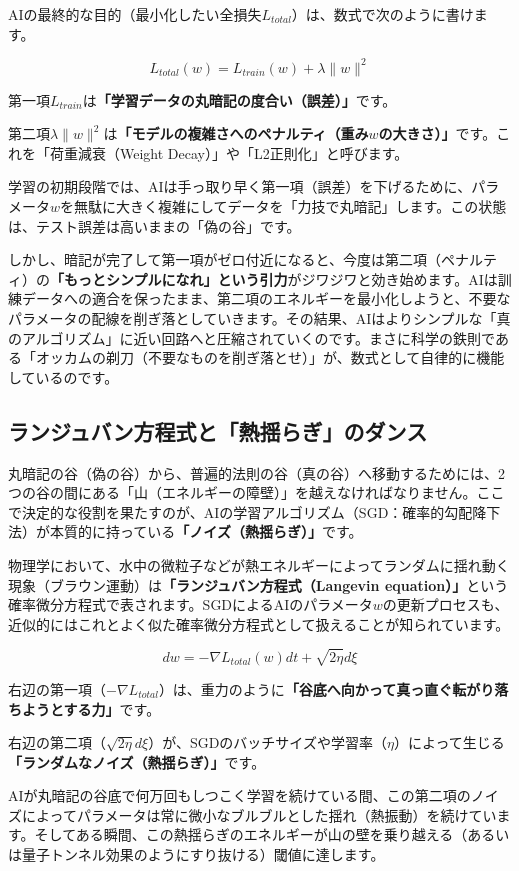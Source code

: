 AIの最終的な目的（最小化したい全損失\(L_{total}\)）は、数式で次のように書けます。

\[L_{total}(w) = L_{train}(w) + \lambda \|w\|^2\]

第一項\(L_{train}\)は\textbf{「学習データの丸暗記の度合い（誤差）」}です。

第二項\(\lambda \|w\|^2\)は\textbf{「モデルの複雑さへのペナルティ（重み\(w\)の大きさ）」}です。これを「荷重減衰（Weight Decay）」や「L2正則化」と呼びます。

学習の初期段階では、AIは手っ取り早く第一項（誤差）を下げるために、パラメータ\(w\)を無駄に大きく複雑にしてデータを「力技で丸暗記」します。この状態は、テスト誤差は高いままの「偽の谷」です。

しかし、暗記が完了して第一項がゼロ付近になると、今度は第二項（ペナルティ）の\textbf{「もっとシンプルになれ」という引力}がジワジワと効き始めます。AIは訓練データへの適合を保ったまま、第二項のエネルギーを最小化しようと、不要なパラメータの配線を削ぎ落としていきます。その結果、AIはよりシンプルな「真のアルゴリズム」に近い回路へと圧縮されていくのです。まさに科学の鉄則である「オッカムの剃刀（不要なものを削ぎ落とせ）」が、数式として自律的に機能しているのです。

\subsection{ランジュバン方程式と「熱揺らぎ」のダンス}

丸暗記の谷（偽の谷）から、普遍的法則の谷（真の谷）へ移動するためには、2つの谷の間にある「山（エネルギーの障壁）」を越えなければなりません。ここで決定的な役割を果たすのが、AIの学習アルゴリズム（SGD：確率的勾配降下法）が本質的に持っている\textbf{「ノイズ（熱揺らぎ）」}です。

物理学において、水中の微粒子などが熱エネルギーによってランダムに揺れ動く現象（ブラウン運動）は\textbf{「ランジュバン方程式（Langevin equation）」}という確率微分方程式で表されます。SGDによるAIのパラメータ\(w\)の更新プロセスも、近似的にはこれとよく似た確率微分方程式として扱えることが知られています。

\[dw = -\nabla L_{total}(w) dt + \sqrt{2\eta} d\xi\]

右辺の第一項（\(-\nabla L_{total}\)）は、重力のように\textbf{「谷底へ向かって真っ直ぐ転がり落ちようとする力」}です。

右辺の第二項（\(\sqrt{2\eta} d\xi\)）が、SGDのバッチサイズや学習率（\(\eta\)）によって生じる\textbf{「ランダムなノイズ（熱揺らぎ）」}です。

AIが丸暗記の谷底で何万回もしつこく学習を続けている間、この第二項のノイズによってパラメータは常に微小なブルブルとした揺れ（熱振動）を続けています。そしてある瞬間、この熱揺らぎのエネルギーが山の壁を乗り越える（あるいは量子トンネル効果のようにすり抜ける）閾値に達します。

